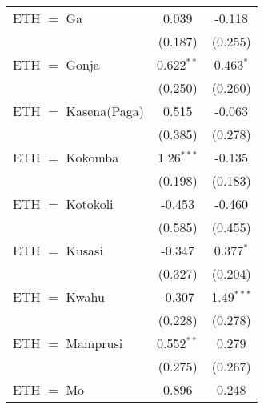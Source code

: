 \begin{table}[htbp!]
\begin{adjustbox}{width = 1\textwidth, max height = 0.95\textheight, center}
\begin{threeparttable}[b]
\begin{tabular}{lcc}
            ETH $=$ Ga                                                                & 0.039         & -0.118\\   
                                                                                      & (0.187)       & (0.255)\\   
            ETH $=$ Gonja                                                             & 0.622$^{**}$  & 0.463$^{*}$\\   
                                                                                      & (0.250)       & (0.260)\\   
            ETH $=$ Kasena(Paga)                                                      & 0.515         & -0.063\\   
                                                                                      & (0.385)       & (0.278)\\   
            ETH $=$ Kokomba                                                           & 1.26$^{***}$  & -0.135\\   
                                                                                      & (0.198)       & (0.183)\\   
            ETH $=$ Kotokoli                                                          & -0.453        & -0.460\\   
                                                                                      & (0.585)       & (0.455)\\   
            ETH $=$ Kusasi                                                            & -0.347        & 0.377$^{*}$\\   
                                                                                      & (0.327)       & (0.204)\\   
            ETH $=$ Kwahu                                                             & -0.307        & 1.49$^{***}$\\   
                                                                                      & (0.228)       & (0.278)\\   
            ETH $=$ Mamprusi                                                          & 0.552$^{**}$  & 0.279\\   
                                                                                      & (0.275)       & (0.267)\\   
            ETH $=$ Mo                                                                & 0.896         & 0.248\\   

\end{tabular}
\end{threeparttable}
\end{adjustbox}
\end{table}
